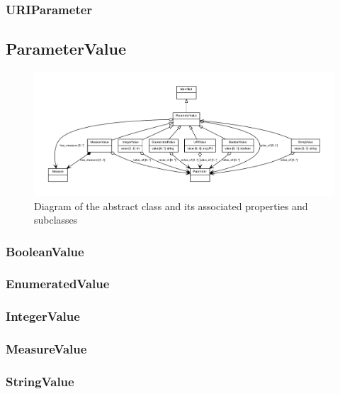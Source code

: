 \subsubsection{URIParameter}
\label{sec:URIParameter}


\subsection{ParameterValue}
\label{sec:ParameterValue}

\begin{figure}[ht]
\begin{center}
\includegraphics[scale=0.8]{figures/ParameterValue_definition_and_abstraction}
\caption[]{Diagram of the  abstract class and its associated properties and subclasses}
\label{uml:ParameterValue}
\end{center}
\end{figure}

\subsubsection{BooleanValue}
\label{sec:BooleanValue}

\subsubsection{EnumeratedValue}
\label{sec:EnumeratedValue}

\subsubsection{IntegerValue}
\label{sec:IntegerValue}

\subsubsection{MeasureValue}
\label{sec:MeasureValue}

\subsubsection{StringValue}
\label{sec:StringValue}

